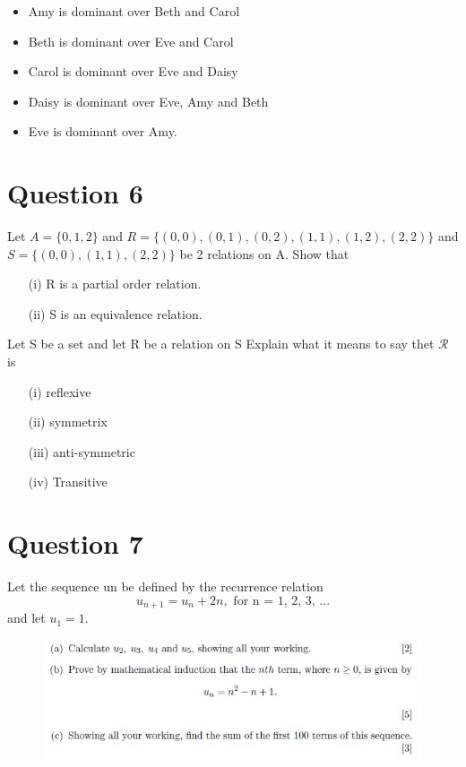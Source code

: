 \documentclass[12pt]{article} %
\begin{document}
\begin{itemize}
	\item Amy is dominant over Beth and Carol
	\item Beth is dominant over Eve and Carol
	\item Carol is dominant over Eve and Daisy
	\item Daisy is dominant over Eve, Amy and Beth
	\item Eve is dominant over Amy.
\end{itemize}

\newpage
\section*{Question 6}

Let $A=\{0,1,2\}$ and $R=\{ (0,0),(0,1),(0,2),(1,1), (1,2), (2,2)\}$
and $S=\{(0,0),(1,1),(2,2)\}$ be 2 relations on A. Show that

\begin{itemize}
	\item[(i)] R is a partial order relation.
	\item[(ii)] S is an equivalence relation.
\end{itemize}

Let S be a set and let R be a relation on S
Explain what it means to say thet $\mathcal{R}$ is

\begin{itemize}
	\item[(i)] reflexive
	\item[(ii)] symmetrix
	\item[(iii)] anti-symmetric
	\item[(iv)] Transitive
	
	
	
\end{itemize}


\section*{Question 7}
Let the sequence un be defined by the recurrence relation
\[u_{n+1} = u_n + 2n, \mbox{ for n = 1, 2, 3, ...}\]
and let $u_1 = 1$.\\
\begin{figure}[h!]
\centering
\includegraphics[width=1.11\linewidth]{SeqSerQuestion2005}
\end{figure}
\end{document}
